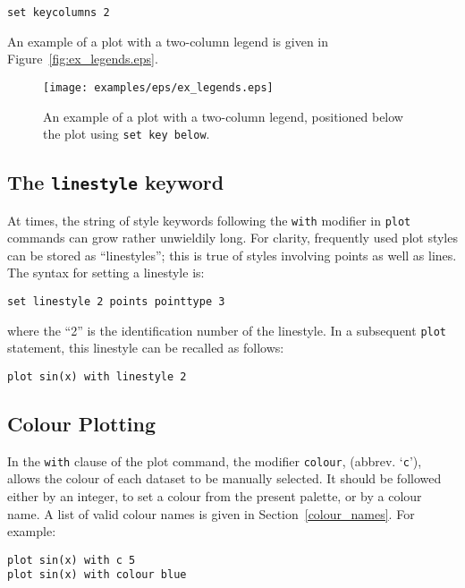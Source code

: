 \documentclass[a4paper,onecolumn,11pt]{book}
\begin{document}
\begin{verbatim}
set keycolumns 2
\end{verbatim}

An example of a plot with a two-column legend is given in Figure~\ref{fig:ex_legends.eps}.

\begin{figure}
\begin{center}
\texttt{[image: examples/eps/ex\_legends.eps]}
\end{center}
\caption{An example of a plot with a two-column legend, positioned below the plot using {\tt set key below}.}
\label{fig:ex_legends}
\end{figure}

\subsection{The \texttt{linestyle} keyword}

At times, the string of style keywords following the \texttt{with} modifier in
\texttt{plot} commands can grow rather unwieldily long. For clarity, frequently
used plot styles can be stored as ``linestyles''; this is true of styles
involving points as well as lines. The syntax for setting a linestyle is:

\begin{verbatim}
set linestyle 2 points pointtype 3
\end{verbatim}

\noindent where the ``2'' is the identification number of the linestyle. In a
subsequent \texttt{plot} statement, this linestyle can be recalled as follows:

\begin{verbatim}
plot sin(x) with linestyle 2
\end{verbatim}

\subsection{Colour Plotting}

 In the \texttt{with}
clause of the plot command, the modifier \texttt{colour}, (abbrev.
`\texttt{c}'), allows the colour of each dataset to be manually selected. It
should be followed either by an integer, to set a colour from the present
palette, or by a colour name. A list of valid colour names is given in
Section~\ref{colour_names}. For example:

\begin{verbatim}
plot sin(x) with c 5
plot sin(x) with colour blue
\end{verbatim}
\end{document}
